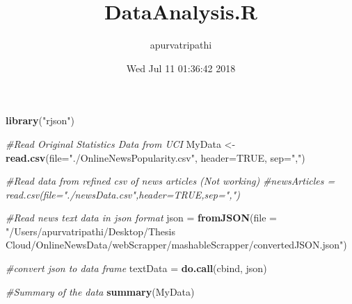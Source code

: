 \documentclass[]{article}
\title{DataAnalysis.R}
\author{apurvatripathi}
\date{Wed Jul 11 01:36:42 2018}
\newenvironment{Shaded}{\begin{snugshade}}{\end{snugshade}}
\newcommand{\KeywordTok}[1]{\textcolor[rgb]{0.13,0.29,0.53}{\textbf{#1}}}
\newcommand{\DataTypeTok}[1]{\textcolor[rgb]{0.13,0.29,0.53}{#1}}
\newcommand{\StringTok}[1]{\textcolor[rgb]{0.31,0.60,0.02}{#1}}
\newcommand{\CommentTok}[1]{\textcolor[rgb]{0.56,0.35,0.01}{\textit{#1}}}
\newcommand{\OtherTok}[1]{\textcolor[rgb]{0.56,0.35,0.01}{#1}}
\newcommand{\NormalTok}[1]{#1}
\begin{document}
\maketitle

\begin{Shaded}
\begin{Highlighting}[]
\KeywordTok{library}\NormalTok{(}\StringTok{"rjson"}\NormalTok{)}

\CommentTok{#Read Original Statistics Data from UCI}
\NormalTok{MyData <-}\StringTok{ }\KeywordTok{read.csv}\NormalTok{(}\DataTypeTok{file=}\StringTok{"./OnlineNewsPopularity.csv"}\NormalTok{, }\DataTypeTok{header=}\OtherTok{TRUE}\NormalTok{, }\DataTypeTok{sep=}\StringTok{","}\NormalTok{)}

\CommentTok{#Read data from refined csv of news articles (Not working)}
\CommentTok{#newsArticles = read.csv(file="./newsData.csv",header=TRUE,sep=",")}

\CommentTok{#Read news text data in json format}
\NormalTok{json =}\StringTok{ }\KeywordTok{fromJSON}\NormalTok{(}\DataTypeTok{file =} \StringTok{"/Users/apurvatripathi/Desktop/Thesis Cloud/OnlineNewsData/webScrapper/mashableScrapper/convertedJSON.json"}\NormalTok{)}

\CommentTok{#convert json to data frame}
\NormalTok{textData =}\StringTok{ }\KeywordTok{do.call}\NormalTok{(cbind, json)}


\CommentTok{#Summary of the data}
\KeywordTok{summary}\NormalTok{(MyData)}
\end{Highlighting}
\end{Shaded}
\end{document}
